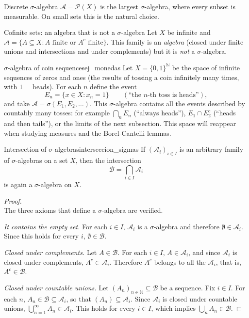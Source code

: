 \documentclass[11pt, a4paper]{article}
\begin{document}
\begin{ejemplo}{Discrete $\sigma$-algebra}{}
$\mathcal{A} = \mathcal{P}(X)$ is the largest $\sigma$-algebra, where every subset is
measurable. On small sets this is the natural choice.
\end{ejemplo}

\begin{ejemplo}{Cofinite sets: an algebra that is not a $\sigma$-algebra}{}
Let $X$ be infinite and $\mathcal{A} = \{A \subseteq X : A \text{ finite or } A^c \text{ finite}\}$.
This family is an \emph{algebra} (closed under finite unions and intersections and under
complements) but it is \emph{not} a $\sigma$-algebra.
\end{ejemplo}

\begin{ejemplo}{$\sigma$-algebra of coin sequences}{ej_monedas}
Let $X = \{0, 1\}^{\mathbb{N}}$ be the space of infinite sequences of zeros and ones (the
results of tossing a coin infinitely many times, with $1$ = heads). For each $n$ define the event
$$ E_n = \{ x \in X : x_n = 1 \} \qquad (\text{``the } n\text{-th toss is heads''}), $$
and take $\mathcal{A} = \sigma(E_1, E_2, \dots)$. This $\sigma$-algebra contains all the
events described by countably many tosses: for example $\bigcap_n E_n$
(``always heads''), $E_1 \cap E_2^c$ (``heads and then tails''), or the limits of the
next subsection. This space will reappear when studying measures and the
Borel-Cantelli lemmas.
\end{ejemplo}

\begin{proposicion}{Intersection of $\sigma$-algebras}{interseccion_sigmas}
If $(\mathcal{A}_i)_{i \in I}$ is an arbitrary family of
$\sigma$-algebras on a set $X$, then the intersection
$$ \mathcal{B} = \bigcap_{i \in I} \mathcal{A}_i $$
is again a $\sigma$-algebra on $X$.
\end{proposicion}

\begin{proof}\leavevmode\\
The three axioms that define a $\sigma$-algebra are verified.

\textit{It contains the empty set.} For each $i \in I$, $\mathcal{A}_i$ is a $\sigma$-algebra and
therefore $\emptyset \in \mathcal{A}_i$. Since this holds for every $i$, $\emptyset \in \mathcal{B}$.

\textit{Closed under complements.} Let $A \in \mathcal{B}$. For each $i \in I$, $A \in
\mathcal{A}_i$, and since $\mathcal{A}_i$ is closed under complements, $A^c \in \mathcal{A}_i$.
Therefore $A^c$ belongs to all the $\mathcal{A}_i$, that is, $A^c \in \mathcal{B}$.

\textit{Closed under countable unions.} Let $(A_n)_{n \in \mathbb{N}} \subseteq \mathcal{B}$ be a
sequence. Fix $i \in I$. For each $n$, $A_n \in \mathcal{B} \subseteq \mathcal{A}_i$, so
that $(A_n) \subseteq \mathcal{A}_i$. Since $\mathcal{A}_i$ is closed under countable unions,
$\bigcup_{n=1}^{\infty} A_n \in \mathcal{A}_i$. This holds for every $i \in I$, which implies
$\bigcup_n A_n \in \mathcal{B}$.
\end{proof}
\end{document}
